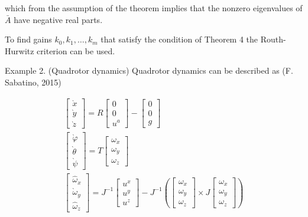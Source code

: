 \documentclass[10pt]{article}
\begin{document}
which from the assumption of the theorem implies that the nonzero eigenvalues of $\bar{A}$ have negative real parts.

To find gains $k_{0}, k_{1}, \ldots, k_{m}$ that satisfy the condition of Theorem 4 the Routh-Hurwitz criterion can be used.

Example 2. (Quadrotor dynamics) Quadrotor dynamics can be described as (F. Sabatino, 2015)

$$
\begin{aligned}
{\left[\begin{array}{l}
\grave{x} \\
\grave{y} \\
\grave{z}
\end{array}\right]=R\left[\begin{array}{l}
0 \\
0 \\
u^{a}
\end{array}\right]-\left[\begin{array}{l}
0 \\
0 \\
g
\end{array}\right] } \\
{\left[\begin{array}{l}
\grave{\varphi} \\
\grave{\theta} \\
\grave{\psi}
\end{array}\right]=T\left[\begin{array}{l}
\omega_{x} \\
\omega_{y} \\
\omega_{z}
\end{array}\right] } \\
{\left[\begin{array}{l}
\hat{\omega}_{x} \\
\grave{\omega}_{y} \\
\hat{\omega}_{z}
\end{array}\right]=J^{-1}\left[\begin{array}{l}
u^{x} \\
u^{y} \\
u^{z}
\end{array}\right]-J^{-1}\left(\left[\begin{array}{c}
\omega_{x} \\
\omega_{y} \\
\omega_{z}
\end{array}\right] \times J\left[\begin{array}{c}
\omega_{x} \\
\omega_{y} \\
\omega_{z}
\end{array}\right]\right) }
\end{aligned}
$$
\end{document}
